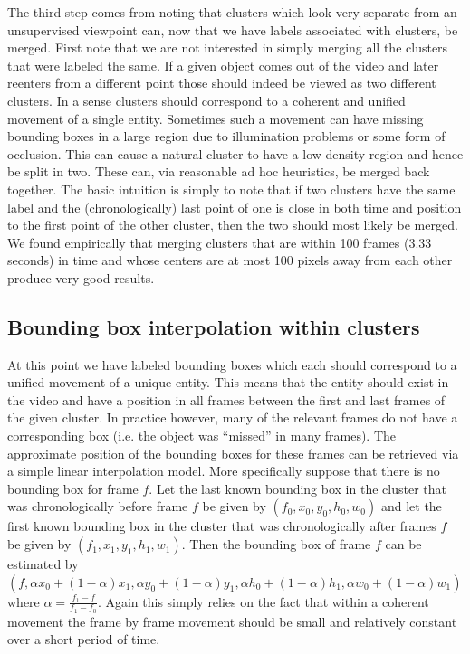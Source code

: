 \documentclass{article}
\begin{document}
The third step comes from noting that clusters which look very separate from an unsupervised viewpoint can, now that we have labels associated with clusters, be merged. First note that we are not interested
in simply merging all the clusters that were labeled the same. If a given object comes out of the video and later reenters from a different point those should indeed be viewed as two different clusters.
In a sense clusters should correspond to a coherent and unified movement of a single entity. Sometimes such a movement can have missing bounding boxes in a large region due to illumination problems or
some form of occlusion. This can cause a natural cluster to have a low density region and hence be split in two. These can, via reasonable ad hoc heuristics, be merged back together. The basic intuition
is simply to note that if two clusters have the same label and the (chronologically) last point of one is close in both time and position to the first point of the other cluster, then the two should
most likely be merged. We found empirically that merging clusters that are within 100 frames (3.33 seconds) in time and whose centers are at most 100 pixels away from each other produce very good results.

\subsection{Bounding box interpolation within clusters}

At this point we have labeled bounding boxes which each should correspond to a unified movement of a unique entity. This means that the entity should exist in the video and have a position in all frames between
the first and last frames of the given cluster. In practice however, many of the relevant frames do not have a corresponding box (i.e. the object was ``missed'' in many frames). The approximate position of the
bounding boxes for these frames can be retrieved via a simple linear interpolation model. More specifically suppose that there is no bounding box for frame $f$. Let the last known bounding box in the cluster
that was chronologically before frame $f$ be given by $(f_0, x_0, y_0, h_0, w_0)$ and let the first known bounding box in the cluster that was chronologically after frames $f$ be given by
$(f_1, x_1, y_1, h_1, w_1)$. Then the bounding box of frame $f$ can be estimated by $(f, \alpha x_0 + (1-\alpha)x_1, \alpha y_0 + (1-\alpha)y_1, \alpha h_0 + (1-\alpha)h_1, \alpha w_0 + (1-\alpha)w_1)$
where $\alpha = \frac{f_1-f}{f_1 - f_0}$. Again this simply relies on the fact that within a coherent movement the frame by frame movement should be small and relatively constant over a short period of time.
\end{document}
